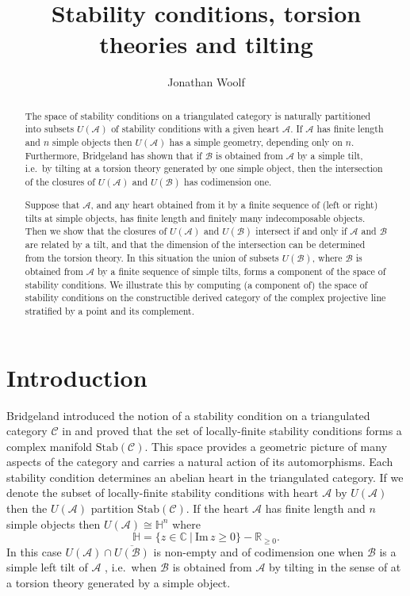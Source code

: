 \documentclass{article}
\title{Stability conditions, torsion theories and tilting} %
\author{Jonathan Woolf}
\theoremstyle{plain}
\theoremstyle{definition}
\theoremstyle{remark}
\newcommand{\ie}{i.e.\ }
\newcommand{\R}{\mathbb{R}}
\newcommand{\C}{\mathbb{C}}
\newcommand{\U}{\mathbb{H}}
\newcommand{\cat}[1]{\mathcal{#1}}
\newcommand{\stab}[1]{\mathrm{Stab}(#1)}
\begin{document}
\maketitle

\begin{abstract}
The space of stability conditions on a triangulated category is naturally partitioned into subsets $U(\cat{A})$ of stability conditions with a given heart $\cat{A}$. If $\cat{A}$ has finite length and $n$ simple objects then $U(\cat{A})$ has a simple geometry, depending only on $n$. Furthermore, Bridgeland has shown that if $\cat{B}$ is obtained from $\cat{A}$ by a simple tilt, \ie by tilting at a torsion theory generated by one simple object, then the intersection of the closures of $U(\cat{A})$ and $U(\cat{B})$ has codimension one. 

Suppose that $\cat{A}$, and any heart obtained from it by a finite sequence of (left or right) tilts at simple objects, has 
finite length and 
%
finitely many indecomposable objects. Then we show that the closures of $U(\cat{A})$ and $U(\cat{B})$ intersect if and only if $\cat{A}$ and $\cat{B}$ are related by a tilt, and that the dimension of the intersection can be determined from the torsion theory. In this situation the union of subsets $U(\cat{B})$, where $\cat{B}$ is obtained from $\cat{A}$ by a finite sequence of simple tilts, forms a component of the space of stability conditions. We illustrate this by computing (a component of) the space of stability conditions on the constructible derived category of the complex projective line stratified by a point and its complement.  
\end{abstract}



\section{Introduction}

Bridgeland introduced the notion of a stability condition on a triangulated category $\cat{C}$ in \cite{MR2373143} and proved that the set of locally-finite stability conditions forms a complex manifold $\stab{\cat{C}}$. This space provides a geometric picture of many aspects of the category and carries a natural action of its automorphisms. Each stability condition determines an abelian heart in the triangulated category. If we denote  the subset of locally-finite stability conditions with heart $\cat{A}$ by  $U(\cat{A})$ then the $U(\cat{A})$ partition $\stab{\cat{C}}$.  If the heart $\cat{A}$ has finite length and  $n$ simple objects then $U(\cat{A})\cong \U^n$ where $$\U = \{ z\in \C \ |\ \mathrm{Im}\, z \geq 0\} - \R_{\geq 0}.$$ 
In this case $U(\cat{A}) \cap \overline{U(\cat{B})}$ is non-empty and of codimension one when $\cat{B}$ is a simple left tilt of $\cat{A}$ \cite[Lemma 5.5]{Bridgeland:fk}, \ie when $\cat{B}$ is obtained from $\cat{A}$ by tilting in the sense of \cite{Happel:1996uq} at a torsion theory generated by a simple object.
\end{document}

